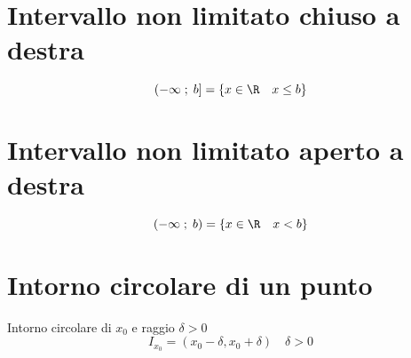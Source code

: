 \section{Intervallo non limitato chiuso a destra}
\begin{equation}
\left(-\infty\; ;\; b\right]=\lbrace x\in\R\quad x\leq b\rbrace
\end{equation}
\section{Intervallo non limitato aperto a destra}
\begin{equation}
\left(-\infty\; ;\; b\right)=\lbrace x\in\R\quad x< b\rbrace
\end{equation}
\section{Intorno circolare di un punto}
Intorno circolare di $x_0$ e raggio $\delta>0$
\begin{equation}
I_{x_0}=\left(x_0-\delta,x_0+\delta
\right)\quad\delta>0
\end{equation}
